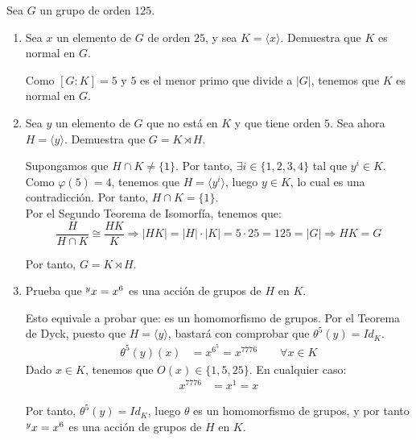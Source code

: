 \documentclass[12pt]{article}
\DeclareMathOperator{\Aut}{Aut}
\begin{document}
    \begin{ejercicio}
        Sea $G$ un grupo de orden $125$.
        \begin{enumerate}
            \item Sea $x$ un elemento de $G$ de orden $25$, y sea $K=\langle x\rangle$. Demuestra que $K$ es normal en $G$.
            
            Como $[G:K]=5$ y $5$ es el menor primo que divide a $|G|$, tenemos que $K$ es normal en $G$.
            \item Sea $y$ un elemento de $G$ que no está en $K$ y que tiene orden $5$. Sea ahora $H=\langle y\rangle$. Demuestra que $G=K\rtimes H$.
            
            Supongamos que $H\cap K\neq \{1\}$. Por tanto, $\exists i\in \{1,2,3,4\}$ tal que $y^i\in K$. Como $\varphi(5)=4$, tenemos que $H=\langle y^i\rangle$, luego $y\in K$, lo cual es una contradicción. Por tanto, $H\cap K=\{1\}$.\\

            Por el Segundo Teorema de Isomorfía, tenemos que:
            \begin{equation*}
                \dfrac{H}{H\cap K}\cong \dfrac{HK}{K}
                \Longrightarrow |HK|=|H|\cdot |K|=5\cdot 25=125=|G|
                \Longrightarrow HK=G
            \end{equation*}

            Por tanto, $G=K\rtimes H$.
            
            \item Prueba que $\prescript{y}{}{x}=x^6$ es una acción de grupos de $H$ en $K$.
            
            Esto equivale a probar que:
            \Func{\theta}{H}{\Aut(k)}{y}{\theta(y)}
            es un homomorfismo de grupos. Por el Teorema de Dyck, puesto que $H=\langle y\rangle$, bastará con comprobar que $\theta^5(y)=Id_K$.
            \begin{align*}
                \theta^5(y)(x) & = x^{6^5} = x^{7776}\qquad \forall x\in K
            \end{align*}
            Dado $x\in K$, tenemos que $O(x)\in \{1,5,25\}$. En cualquier caso:
            \begin{align*}
                x^{7776} & = x^1 = x
            \end{align*}

            Por tanto, $\theta^5(y)=Id_K$, luego $\theta$ es un homomorfismo de grupos, y por tanto $\prescript{y}{}{x}=x^6$ es una acción de grupos de $H$ en $K$.



\end{enumerate}
\end{ejercicio}
\end{document}
